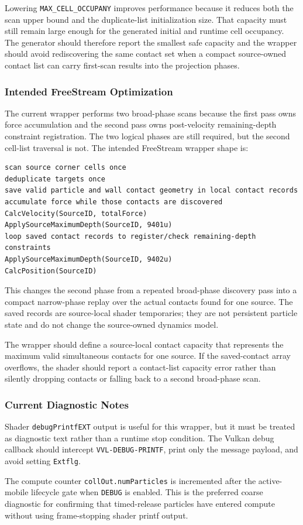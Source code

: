 Lowering \texttt{MAX\_CELL\_OCCUPANY} improves performance because it reduces
both the scan upper bound and the duplicate-list initialization size.  That
capacity must still remain large enough for the generated initial and runtime
cell occupancy.  The generator should therefore report the smallest safe
capacity and the wrapper should avoid rediscovering the same contact set when
a compact source-owned contact list can carry first-scan results into the
projection phases.

\subsubsection{Intended FreeStream Optimization}

The current wrapper performs two broad-phase scans because the first pass owns
force accumulation and the second pass owns post-velocity remaining-depth
constraint registration.  The two logical phases are still required, but the
second cell-list traversal is not.  The intended FreeStream wrapper shape is:
\begin{verbatim}
scan source corner cells once
deduplicate targets once
save valid particle and wall contact geometry in local contact records
accumulate force while those contacts are discovered
CalcVelocity(SourceID, totalForce)
ApplySourceMaximumDepth(SourceID, 9401u)
loop saved contact records to register/check remaining-depth constraints
ApplySourceMaximumDepth(SourceID, 9402u)
CalcPosition(SourceID)
\end{verbatim}

This changes the second phase from a repeated broad-phase discovery pass into
a compact narrow-phase replay over the actual contacts found for one source.
The saved records are source-local shader temporaries; they are not persistent
particle state and do not change the source-owned dynamics model.

The wrapper should define a source-local contact capacity that represents the
maximum valid simultaneous contacts for one source.  If the saved-contact
array overflows, the shader should report a contact-list capacity error
rather than silently dropping contacts or falling back to a second broad-phase
scan.

\subsubsection{Current Diagnostic Notes}

Shader \texttt{debugPrintfEXT} output is useful for this wrapper, but it must
be treated as diagnostic text rather than a runtime stop condition.  The
Vulkan debug callback should intercept \texttt{VVL-DEBUG-PRINTF}, print only
the message payload, and avoid setting \texttt{Extflg}.

The compute counter \texttt{collOut.numParticles} is incremented after the
active-mobile lifecycle gate when \texttt{DEBUG} is enabled.  This is the
preferred coarse diagnostic for confirming that timed-release particles have
entered compute without using frame-stopping shader printf output.
